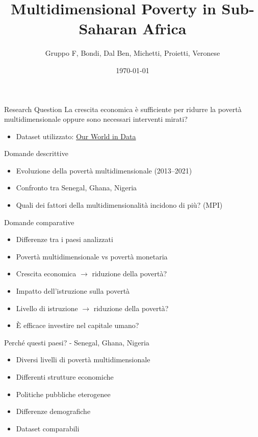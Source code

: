 \documentclass{beamer}
\title{Multidimensional Poverty in Sub-Saharan Africa}
\author{Gruppo F, Bondi, Dal Ben, Michetti, Proietti, Veronese}
\date{\today}
\begin{document}
	
	\begin{frame}
		\titlepage
	\end{frame}
	
	\begin{frame}{Research Question}
		La crescita economica è sufficiente per ridurre la povertà multidimensionale oppure sono necessari interventi mirati?
		\begin{itemize}
			\item Dataset utilizzato: \href{https://ourworldindata.org/grapher/multidimensional-poverty-index-mpi-hot}{Our World in Data}
		\end{itemize}
	\end{frame}
	
	\begin{frame}{Domande descrittive}
		\begin{itemize}
			\item Evoluzione della povertà multidimensionale (2013--2021)
			\item Confronto tra Senegal, Ghana, Nigeria
			\item Quali dei fattori della multidimensionalità incidono di più? (MPI)
		\end{itemize}
	\end{frame}
	
	\begin{frame}{Domande comparative}
		\begin{itemize}
			\item Differenze tra i paesi analizzati
			\item Povertà multidimensionale vs povertà monetaria
			\item Crescita economica $\rightarrow$ riduzione della povertà?
			\item Impatto dell’istruzione sulla povertà
			\item Livello di istruzione $\rightarrow$ riduzione della povertà?
			\item È efficace investire nel capitale umano?
		\end{itemize}
	\end{frame}
	
	
	\begin{frame}{Perché questi paesi? - Senegal, Ghana, Nigeria}
		\begin{itemize}
			\item Diversi livelli di povertà multidimensionale
			\item Differenti strutture economiche
			\item Politiche pubbliche eterogenee
			\item Differenze demografiche
			\item Dataset comparabili
		\end{itemize}
	\end{frame}
	
\end{document}
